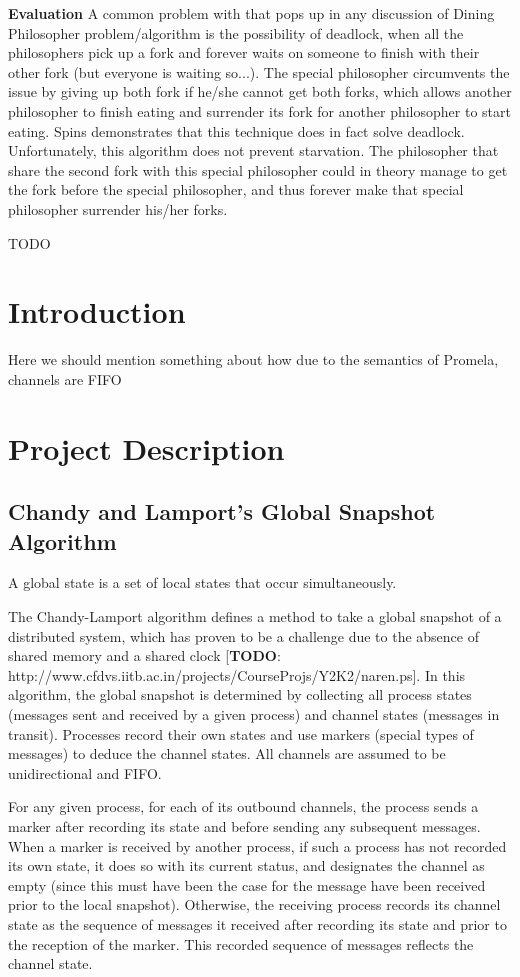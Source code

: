 \documentclass[12pt]{article}
\begin{document}
\begin{flushleft}
\textbf{Evaluation}
\newline
A common problem with that pops up in any discussion of Dining Philosopher problem/algorithm is the possibility of deadlock, when all the philosophers pick up a fork and forever waits on someone to finish with their other fork (but everyone is waiting so...). The special philosopher circumvents the issue by giving up both fork if he/she cannot get both forks, which allows another philosopher to finish eating and surrender its fork for another philosopher to start eating. Spins demonstrates that this technique does in fact solve deadlock.
Unfortunately, this algorithm does not prevent starvation. The philosopher that share the second fork with this special philosopher could in theory manage to get the fork before the special philosopher, and thus forever make that special philosopher surrender his/her forks.

TODO
\section{Introduction}
Here we should mention something about how due to the semantics of Promela, channels are FIFO
\section{Project Description}
\subsection{Chandy and Lamport's Global Snapshot Algorithm}

A global state is a set of local states that occur simultaneously.

The Chandy-Lamport algorithm defines a method to take a global snapshot of a distributed system, which has proven to be a challenge due to the absence of shared memory and a shared clock [\textbf{TODO}: http://www.cfdvs.iitb.ac.in/projects/CourseProjs/Y2K2/naren.ps]. In this algorithm, the global snapshot is determined by collecting all process states (messages sent and received by a given process) and channel states (messages in transit). Processes record their own states and use markers (special types of messages) to deduce the channel states. All channels are assumed to be unidirectional and FIFO.

For any given process, for each of its outbound channels, the process sends a marker after recording its state and before sending any subsequent messages. When a marker is received by another process, if such a process has not recorded its own state, it does so with its current status, and designates the channel as empty (since this must have been the case for the message have been received prior to the local snapshot). Otherwise, the receiving process records its channel state as the sequence of messages it received after recording its state and prior to the reception of the marker. This recorded sequence of messages reflects the channel state.


\end{flushleft}
\end{document}
